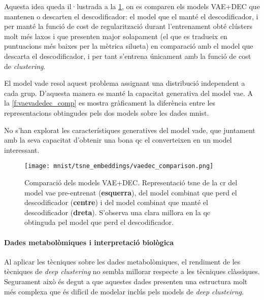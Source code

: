\documentclass[CAT,BIB]{TFUOC}%
\begin{document}
        Aquesta idea queda il·lustrada a la \cref{f:vaedec_comp},
        on es comparen els models VAE+DEC que mantenen o descarten el descodificador:
        el model que el manté el descodificador,
        i per manté la funció de cost de regularització durant l'entrenament
        obté clústers molt més laxos i que presenten major solapament
        (el que es tradueix en puntuacions més baixes per la mètrica silueta)
        en comparació amb el model que descarta el descodificador,
        i per tant s'entrena únicament amb la funció de cost de \textit{clustering}.

        El model \gls{vade} resol aquest problema
        assignant una distribució independent a cada grup.
        D'aquesta manera es manté la capacitat generativa del model \gls{vae}.
        A la \cref{f:vaevadedec_comp} es mostra gràficament
        la diferència entre les representacions obtingudes pels dos models
        sobre les dades \gls{mnist}.

        No s'han explorat les característiques generatives
        del model \gls{vade},
        que juntament amb la seva capacitat d'obtenir una bona \gls{qc}
        el converteixen en un model interessant.

        \begin{figure}
            \centering
            \texttt{[image: mnist/tsne\_embeddings/vaedec\_comparison.png]}
            \caption[Comparació dels models VAE+DEC]{
                Comparació dels models VAE+DEC.
                Representació \gls{tsne} de la \gls{cr} del model \gls{vae} pre-entrenat (\textbf{esquerra}),
                del model combinat que perd el descodificador (\textbf{centre})
                i del model combinat que manté el descodificador (\textbf{dreta}).
                S'observa una clara millora en la \gls{qc} obtinguda pel model que perd el descodificador.
            }
            \label{f:vaedec_comp}
        \end{figure}


    \paragraph{Dades metabolòmiques i interpretació biològica}
        Al aplicar les tècniques sobre les dades metabolòmiques,
        el rendiment de les tècniques de \textit{deep clustering}
        no sembla millorar respecte a les tècniques clàssiques.
        Segurament això és degut a que aquestes dades presenten
        una estructura molt més complexa
        que és difícil de modelar inclús pels models de \textit{deep clusteirng}.
\end{document}
